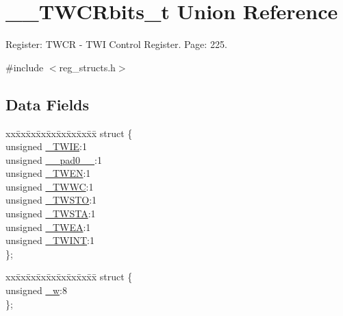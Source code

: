 \hypertarget{union_____t_w_c_rbits__t}{\section{\+\_\+\+\_\+\+T\+W\+C\+Rbits\+\_\+t Union Reference}
\label{union_____t_w_c_rbits__t}
}


Register\+: T\+W\+C\+R -\/ T\+W\+I Control Register. Page\+: 225.  




{\ttfamily \#include $<$reg\+\_\+structs.\+h$>$}

\subsection*{Data Fields}
\begin{DoxyCompactItemize}
\item 
\begin{tabbing}
xx\=xx\=xx\=xx\=xx\=xx\=xx\=xx\=xx\=\kill
struct \{\\
\>unsigned \hyperlink{union_____t_w_c_rbits__t_a4d2bedf1efc4fa333f2dd5a82fe1e9ef}{\_TWIE}:1\\
\>unsigned \hyperlink{union_____t_w_c_rbits__t_a87365edbabc992daafd4bac1eb1303f2}{\_\_pad0\_\_}:1\\
\>unsigned \hyperlink{union_____t_w_c_rbits__t_a2ccc1448460231c19857d0ecd1849fb0}{\_TWEN}:1\\
\>unsigned \hyperlink{union_____t_w_c_rbits__t_aac48237935a77e00b9440f81e5adeeaa}{\_TWWC}:1\\
\>unsigned \hyperlink{union_____t_w_c_rbits__t_a7f3866509f9a4f3be7a30f491f4b8248}{\_TWSTO}:1\\
\>unsigned \hyperlink{union_____t_w_c_rbits__t_abfe9c57703e8ba38ce9515bfdcfd9b38}{\_TWSTA}:1\\
\>unsigned \hyperlink{union_____t_w_c_rbits__t_a087c9931a3756219b4a6fe6701724dc5}{\_TWEA}:1\\
\>unsigned \hyperlink{union_____t_w_c_rbits__t_a5f4e9f5b9c0ed6962626c471b8aead9e}{\_TWINT}:1\\
\}; \\

\end{tabbing}\item 
\begin{tabbing}
xx\=xx\=xx\=xx\=xx\=xx\=xx\=xx\=xx\=\kill
struct \{\\
\>unsigned \hyperlink{union_____t_w_c_rbits__t_aa0b5fffb097c5e65a8090197a7470e6b}{\_w}:8\\
\}; \\

\end{tabbing}\end{DoxyCompactItemize}


